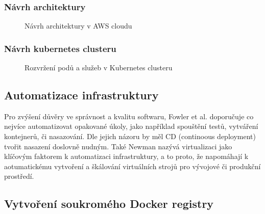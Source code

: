 \documentclass[thesis=M,czech]{FITthesis}[2019/12/23]
\theoremstyle{plain}
\theoremstyle{definition}
\begin{document}
\subsubsection{Návrh architektury}


\begin{figure}[H]\centering
	

	\caption[Návrh architektury v AWS cloudu]{Návrh architektury v AWS cloudu}\label{fig:float}
\end{figure}


\subsubsection{Návrh kubernetes clusteru}

\begin{figure}[H]\centering
	

	\caption[Rozvržení podů a služeb v Kubernetes clusteru]{Rozvržení podů a služeb v Kubernetes clusteru}\label{fig:float}
\end{figure}







\subsection{Automatizace infrastruktury}

Pro zvýšení důvěry ve správnost a kvalitu softwaru, Fowler et al. \cite{microservices-article} doporučuje co nejvíce automatizovat opakované úkoly, jako například spouštění testů, vytváření kontejnerů, či nasazování. Dle jejich názoru by měl CD (continoous deployment) tvořit nasazení doslovně nudným. Také Newman \cite{microservices-book} nazývá virtualizaci jako klíčovým faktorem k automatizaci infrastruktury, a to proto, že napomáhají k aotumatickému vytvoření a škálování virtuálních strojů pro vývojové či produkční prostředí.



\subsection{Vytvoření soukromého Docker registry}
\end{document}
